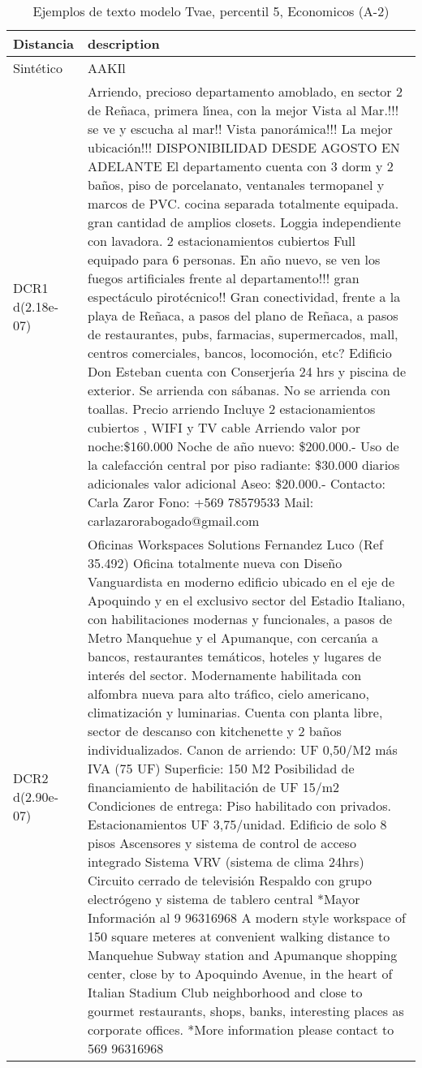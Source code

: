 \begin{table}[H]
\centering
\fontsize{10}{14}\selectfont
\caption{Ejemplos de texto modelo Tvae, percentil 5, Economicos (A-2)}
\label{table-example-economicos-a-2-tvae-5p-text}
\begin{tabular}{|l|m{35em}|}
\hline
\rowcolor[gray]{0.8}
Distancia & description \\
\hline Sintético & AAKIl \\
\hline DCR1 d(2.18e-07) & Arriendo, precioso departamento amoblado, en sector 2 de Re\~naca, primera l{\'\i}nea, con la mejor Vista al Mar.!!! se ve y escucha al mar!! Vista panor\'amica!!! La mejor ubicaci\'on!!! DISPONIBILIDAD DESDE AGOSTO EN ADELANTE El departamento cuenta con 3 dorm y 2 ba\~nos, piso de porcelanato, ventanales termopanel y marcos de PVC. cocina separada totalmente equipada. gran cantidad de amplios closets. Loggia independiente con lavadora. 2 estacionamientos cubiertos Full equipado para 6 personas. En a\~no nuevo, se ven los fuegos artificiales frente al departamento!!! gran espect\'aculo pirot\'ecnico!! Gran conectividad, frente a la playa de Re\~naca, a pasos del plano de Re\~naca, a pasos de restaurantes, pubs, farmacias, supermercados, mall, centros comerciales, bancos, locomoci\'on, etc?  Edificio Don Esteban cuenta con Conserjer{\'\i}a 24 hrs y piscina de exterior.  Se arrienda con s\'abanas.  No se arrienda con toallas.  Precio arriendo Incluye 2 estacionamientos cubiertos , WIFI y TV cable  Arriendo valor por noche:\$160.000  Noche de a\~no nuevo: \$200.000.-  Uso de la calefacci\'on central por piso radiante: \$30.000 diarios adicionales  valor adicional Aseo: \$20.000.-  Contacto: Carla Zaror Fono: +569 78579533 Mail: carlazarorabogado@gmail.com \\
\hline DCR2 d(2.90e-07) & Oficinas Workspaces Solutions Fernandez Luco (Ref 35.492)  Oficina totalmente nueva con Dise\~no Vanguardista en moderno edificio ubicado en el eje de Apoquindo y en el exclusivo sector del Estadio Italiano, con habilitaciones modernas y funcionales, a pasos de Metro Manquehue y el Apumanque, con cercan{\'\i}a a bancos, restaurantes tem\'aticos, hoteles y lugares de inter\'es del sector. Modernamente habilitada con alfombra nueva para alto tr\'afico, cielo americano, climatizaci\'on y luminarias. Cuenta con planta libre, sector de descanso con kitchenette y 2 ba\~nos individualizados.   Canon de arriendo: UF 0,50/M2 m\'as IVA (75 UF)   Superficie: 150 M2   Posibilidad de financiamiento de habilitaci\'on de UF 15/m2   Condiciones de entrega: Piso habilitado con privados.   Estacionamientos UF 3,75/unidad.   Edificio de solo 8 pisos   Ascensores y sistema de control de acceso integrado   Sistema VRV (sistema de clima 24hrs)   Circuito cerrado de televisi\'on   Respaldo con grupo electr\'ogeno y sistema de tablero central *Mayor Informaci\'on al 9 96316968 A modern style workspace of 150 square meteres at convenient walking distance to Manquehue Subway station and Apumanque shopping center, close by to Apoquindo Avenue, in the heart of Italian Stadium Club neighborhood and close to gourmet restaurants, shops, banks, interesting places as corporate offices. *More information please contact to 569 96316968 \\
\hline
\end{tabular}
\end{table}
